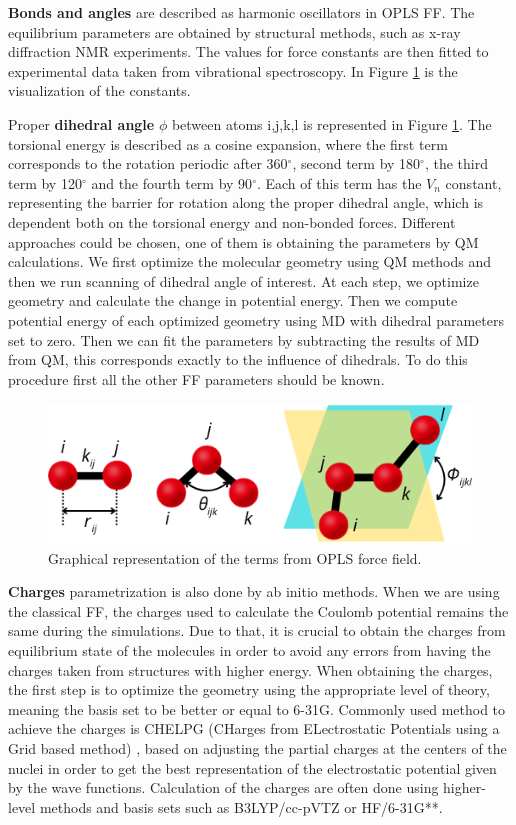 \textbf{Bonds and angles} are described as harmonic oscillators in OPLS FF. The equilibrium parameters are obtained by structural methods, such as x-ray diffraction NMR experiments. The values for force constants are then fitted to experimental data taken from vibrational spectroscopy. In Figure \ref{fig:torsion} is the visualization of the constants.

Proper \textbf{dihedral angle} $\phi$ between atoms i,j,k,l is represented in Figure \ref{fig:torsion}. The torsional energy is described as a cosine expansion, where the first term corresponds to the rotation periodic after 360$^\circ$, second term by 180$^\circ$, the third term by 120$^\circ$ and the fourth term by 90$^\circ$. Each of this term has the $V_n$ constant, representing the barrier for rotation along the proper dihedral angle, which is dependent both on the torsional energy and non-bonded forces. Different approaches could be chosen, one of them is obtaining the parameters by QM calculations. \cite{mackerell_empirical_2004} We first optimize the molecular geometry using QM methods and then we run scanning of dihedral angle of interest. At each step, we optimize geometry and calculate the change in potential energy.  Then we compute potential energy of each optimized geometry using MD with dihedral parameters set to zero. Then we can fit the parameters by subtracting the results of MD from QM, this corresponds exactly to the influence of dihedrals. To do this procedure first all the other FF parameters should be known. 
\vspace{-0.2cm}
\begin{figure}[H]
	\centering
	\includegraphics[width=0.63\linewidth]{img/uhly_canva.png} 
\vspace{-0.2cm}
\caption{Graphical representation of the terms from OPLS force field.}
\label{fig:torsion}  
\end{figure}
\vspace{-0.5cm}

\textbf{Charges} parametrization is also done by ab initio methods. When we are using the classical FF, the charges used to calculate the Coulomb potential remains the same during the simulations. Due to that, it is crucial to obtain the charges from equilibrium state of the molecules in order to avoid any errors from having the charges taken from structures with higher energy. When obtaining the charges, the first step is to optimize the geometry using the appropriate level of theory, meaning the basis set to be better or equal to 6-31G. Commonly used method to achieve the charges is CHELPG (CHarges from ELectrostatic Potentials using a Grid based method) \cite{breneman_determining_1990}, based on adjusting the partial charges at the centers of the nuclei in order to get the best representation of the electrostatic potential given by the wave functions. Calculation of the charges are often done using higher-level methods and basis sets such as B3LYP/cc-pVTZ or HF/6-31G**.

